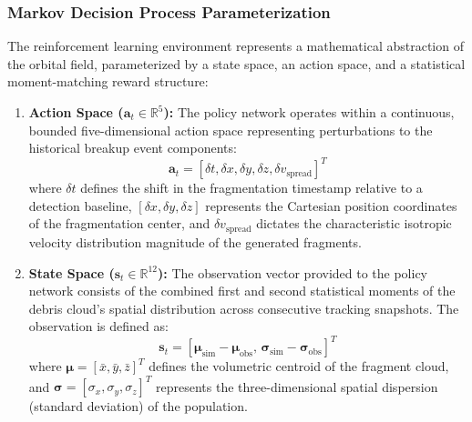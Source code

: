 \documentclass[letterpaper, preprint, 11pt]{AAS}
\begin{document}
\subsubsection{Markov Decision Process Parameterization}
The reinforcement learning environment represents a mathematical abstraction of the orbital field, parameterized by a state space, an action space, and a statistical moment-matching reward structure:
\begin{enumerate}
    \item \textbf{Action Space ($\mathbf{a}_t \in \mathbb{R}^5$):} The policy network operates within a continuous, bounded five-dimensional action space representing perturbations to the historical breakup event components:
    \begin{equation}
        \mathbf{a}_t = \left[ \delta t, \delta x, \delta y, \delta z, \delta v_{\text{spread}} \right]^T
        \label{eq:ppo_action_space}
    \end{equation}
    where $\delta t$ defines the shift in the fragmentation timestamp relative to a detection baseline, $[\delta x, \delta y, \delta z]$ represents the Cartesian position coordinates of the fragmentation center, and $\delta v_{\text{spread}}$ dictates the characteristic isotropic velocity distribution magnitude of the generated fragments.
    
    \item \textbf{State Space ($\mathbf{s}_t \in \mathbb{R}^{12}$):} The observation vector provided to the policy network consists of the combined first and second statistical moments of the debris cloud's spatial distribution across consecutive tracking snapshots. The observation is defined as:
    \begin{equation}
        \mathbf{s}_t = \left[ \boldsymbol{\mu}_{\text{sim}} - \boldsymbol{\mu}_{\text{obs}}, \, \boldsymbol{\sigma}_{\text{sim}} - \boldsymbol{\sigma}_{\text{obs}} \right]^T
        \label{eq:ppo_state_space}
    \end{equation}
    where $\boldsymbol{\mu} = [\bar{x}, \bar{y}, \bar{z}]^T$ defines the volumetric centroid of the fragment cloud, and $\boldsymbol{\sigma} = [\sigma_x, \sigma_y, \sigma_z]^T$ represents the three-dimensional spatial dispersion (standard deviation) of the population.
    

\end{enumerate}
\end{document}
